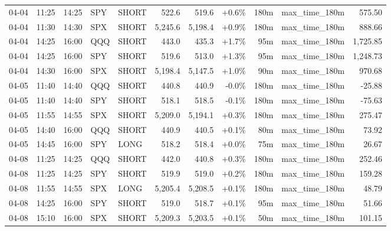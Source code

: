 \documentclass[11pt,a4paper,twoside]{article}
\begin{document}
\begin{center}
\begin{longtable}{>{\color{txtmain}}l l l l l r r r r >{\color{txtmain}}l r}
04-04 & 11:25 & 14:25 & SPY & SHORT & 522.6 & 519.6 & \textcolor{wingreen}{+0.6\%} & 180m & max\_time\_180m & \textcolor{wingreen}{575.50} \\
04-04 & 11:30 & 14:30 & SPX & SHORT & 5,245.6 & 5,198.4 & \textcolor{wingreen}{+0.9\%} & 180m & max\_time\_180m & \textcolor{wingreen}{888.66} \\
04-04 & 14:25 & 16:00 & QQQ & SHORT & 443.0 & 435.3 & \textcolor{wingreen}{+1.7\%} & 95m & max\_time\_180m & \textcolor{wingreen}{1,725.85} \\
04-04 & 14:25 & 16:00 & SPY & SHORT & 519.6 & 513.0 & \textcolor{wingreen}{+1.3\%} & 95m & max\_time\_180m & \textcolor{wingreen}{1,248.73} \\
04-04 & 14:30 & 16:00 & SPX & SHORT & 5,198.4 & 5,147.5 & \textcolor{wingreen}{+1.0\%} & 90m & max\_time\_180m & \textcolor{wingreen}{970.68} \\
04-05 & 11:40 & 14:40 & QQQ & SHORT & 440.8 & 440.9 & \textcolor{lossred}{-0.0\%} & 180m & max\_time\_180m & \textcolor{lossred}{-25.88} \\
04-05 & 11:40 & 14:40 & SPY & SHORT & 518.1 & 518.5 & \textcolor{lossred}{-0.1\%} & 180m & max\_time\_180m & \textcolor{lossred}{-75.63} \\
04-05 & 11:55 & 14:55 & SPX & SHORT & 5,209.0 & 5,194.1 & \textcolor{wingreen}{+0.3\%} & 180m & max\_time\_180m & \textcolor{wingreen}{275.47} \\
04-05 & 14:40 & 16:00 & QQQ & SHORT & 440.9 & 440.5 & \textcolor{wingreen}{+0.1\%} & 80m & max\_time\_180m & \textcolor{wingreen}{73.92} \\
04-05 & 14:45 & 16:00 & SPY & LONG & 518.2 & 518.4 & \textcolor{wingreen}{+0.0\%} & 75m & max\_time\_180m & \textcolor{wingreen}{26.67} \\
04-08 & 11:25 & 14:25 & QQQ & SHORT & 442.0 & 440.8 & \textcolor{wingreen}{+0.3\%} & 180m & max\_time\_180m & \textcolor{wingreen}{252.46} \\
04-08 & 11:25 & 14:25 & SPY & SHORT & 519.9 & 519.0 & \textcolor{wingreen}{+0.2\%} & 180m & max\_time\_180m & \textcolor{wingreen}{159.28} \\
04-08 & 11:55 & 14:55 & SPX & LONG & 5,205.4 & 5,208.5 & \textcolor{wingreen}{+0.1\%} & 180m & max\_time\_180m & \textcolor{wingreen}{48.79} \\
04-08 & 14:25 & 16:00 & SPY & SHORT & 519.0 & 518.7 & \textcolor{wingreen}{+0.1\%} & 95m & max\_time\_180m & \textcolor{wingreen}{51.66} \\
04-08 & 15:10 & 16:00 & SPX & SHORT & 5,209.3 & 5,203.5 & \textcolor{wingreen}{+0.1\%} & 50m & max\_time\_180m & \textcolor{wingreen}{101.15} \\

\end{longtable}
\end{center}
\end{document}
